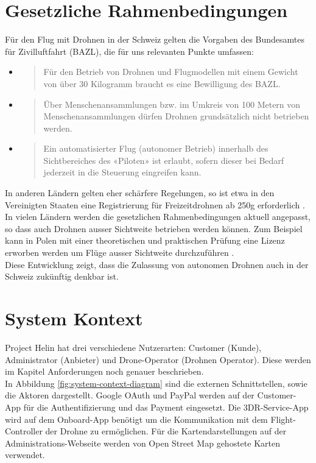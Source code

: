 \section{Gesetzliche Rahmenbedingungen}
Für den Flug mit Drohnen in der Schweiz gelten die Vorgaben des Bundesamtes für Zivilluftfahrt (BAZL), die für uns relevanten Punkte umfassen:
\begin{itemize}
	\item{\blockquote{Für den Betrieb von Drohnen und Flugmodellen mit einem Gewicht von über 30 Kilogramm braucht es eine Bewilligung des BAZL.} \cite{drohne-bazl}}
	\item{\blockquote{Über Menschenansammlungen bzw. im Umkreis von 100 Metern von Menschenansammlungen dürfen Drohnen grundsätzlich nicht betrieben werden.} \cite{drohne-bazl}}
	\item{\blockquote{Ein automatisierter Flug (autonomer Betrieb) innerhalb des Sichtbereiches des «Piloten» ist erlaubt, sofern dieser bei Bedarf jederzeit in die Steuerung eingreifen kann.}
	\cite{drohne-bazl}}
\end{itemize}
In anderen Ländern gelten eher schärfere Regelungen, so ist etwa in den Vereinigten Staaten eine Registrierung für Freizeitdrohnen ab 250g erforderlich \cite[]{pwc-drone}. In vielen Ländern werden die gesetzlichen Rahmenbedingungen aktuell angepasst, so dass auch Drohnen ausser Sichtweite betrieben werden können. Zum Beispiel kann in Polen mit einer theoretischen und praktischen Prüfung eine Lizenz erworben werden um Flüge ausser Sichtweite durchzuführen \cite[]{pwc-drone}.\\

Diese Entwicklung zeigt, dass die Zulassung von autonomen Drohnen auch in der Schweiz zukünftig denkbar ist. 

\section{System Kontext}

Project Helin hat drei verschiedene Nutzerarten: Customer (Kunde), Administrator (Anbieter) und Drone-Operator (Drohnen Operator). Diese werden im Kapitel Anforderungen noch genauer beschrieben.\\

In Abbildung \ref{fig:system-context-diagram} sind die externen Schnittstellen, sowie die Aktoren dargestellt. Google OAuth und PayPal werden auf der Customer-App für die Authentifizierung und das Payment eingesetzt. Die 3DR-Service-App wird auf dem Onboard-App benötigt um die Kommunikation mit dem Flight-Controller der Drohne zu ermöglichen. Für die Kartendarstellungen auf der Administrations-Webseite werden von Open Street Map gehostete Karten verwendet.


